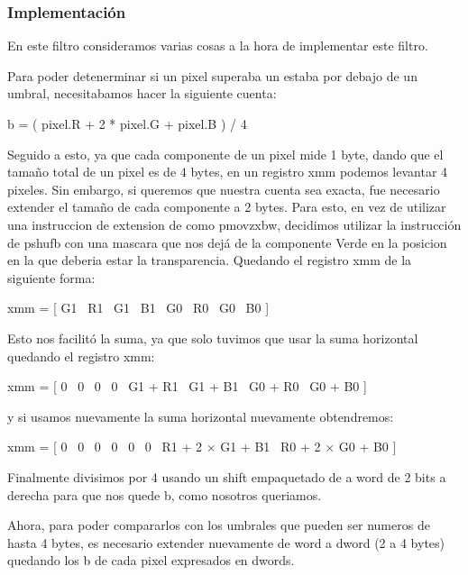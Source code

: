 \documentclass[a4paper]{article}
\begin{document}
\subsubsection{Implementaci\'on}

En este filtro consideramos varias cosas a la hora de implementar este filtro.

Para poder detenerminar si un pixel superaba un estaba por debajo de un umbral, necesitabamos hacer la siguiente cuenta:

\begin{center}
	b = ( pixel.R + 2 * pixel.G + pixel.B ) / 4
\end{center}

Seguido a esto, ya que cada componente de un pixel mide 1 byte, dando que el tama\~no total de un pixel es de 4 bytes, en un registro xmm podemos levantar 4 pixeles. Sin embargo, si queremos que nuestra cuenta sea exacta, fue necesario extender el tama\~no de cada componente a 2 bytes. Para esto, en vez de utilizar una instruccion de extension de como pmovzxbw, decidimos utilizar la instrucción de pshufb con una mascara que nos dejá de la componente Verde en la posicion en la que deberia estar la transparencia. Quedando el registro xmm de la siguiente forma: 

\begin{center}
	xmm = [ G1 \textpipe\ R1 \textpipe\ G1 \textpipe\ B1 \textpipe\ G0 \textpipe\ R0 \textpipe\ G0 \textpipe\ B0 ]
\end{center}

Esto nos facilit\'o la suma, ya que solo tuvimos que usar la suma horizontal quedando el registro xmm:

\begin{center}
	xmm = [ 0 \textpipe\ 0 \textpipe\ 0 \textpipe\ 0 \textpipe\ G1 + R1 \textpipe\ G1 + B1 \textpipe\ G0 + R0 \textpipe\ G0 + B0 ]
\end{center}

y si usamos nuevamente la suma horizontal nuevamente obtendremos:

\begin{center}
	xmm = [ 0 \textpipe\ 0 \textpipe\ 0 \textpipe\ 0 \textpipe\ 0 \textpipe\ 0 \textpipe\ R1 + 2 $\times$ G1 + B1 \textpipe\ R0 + 2 $\times$ G0 + B0 ]
\end{center}

Finalmente divisimos por 4 usando un shift empaquetado de a word de 2 bits a derecha para que nos quede b, como nosotros queriamos.

Ahora, para poder compararlos con los umbrales que pueden ser numeros de hasta 4 bytes, es necesario extender nuevamente de word a dword (2 a 4 bytes) quedando los b de cada pixel expresados en dwords.
\end{document}
